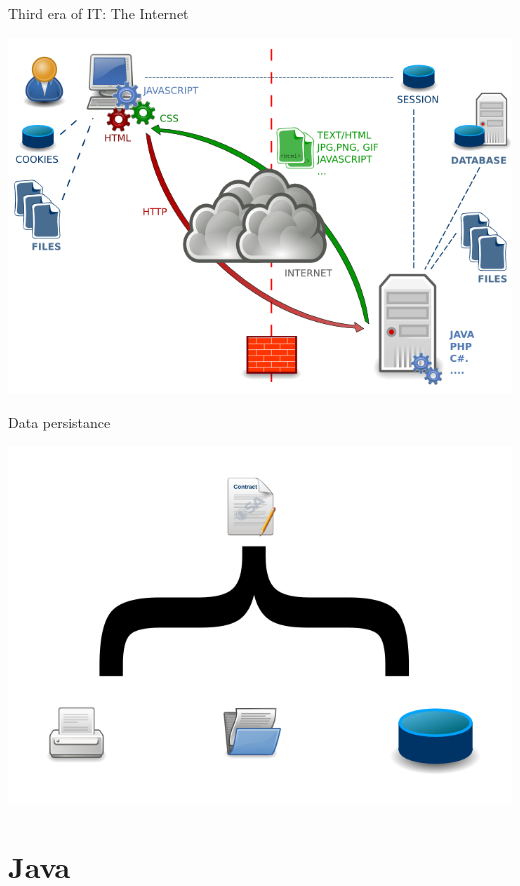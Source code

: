 {  \begin{frame}{Third era of IT: The Internet}
    \begin{center}
      \includegraphics[scale=0.3]{img/internet.png}
    \end{center}
  \end{frame}

  \begin{frame}{Data persistance}
    \begin{center}
      \includegraphics[scale=0.3]{img/persistance.png}
    \end{center}
  \end{frame}

  \section{Java}

}
